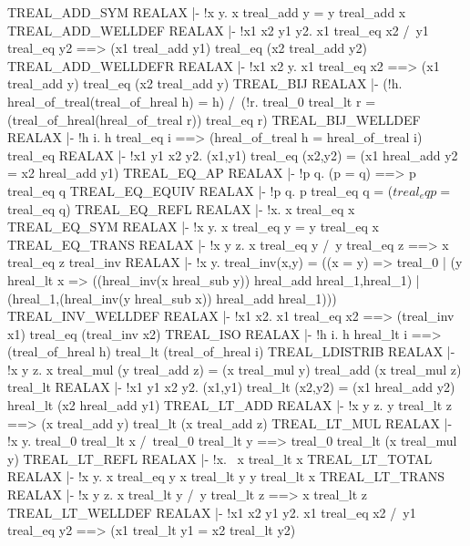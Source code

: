\ENDTHEOREM
\THEOREM TREAL\_ADD\_SYM REALAX
|- !x y. x treal_add y = y treal_add x
\ENDTHEOREM
\THEOREM TREAL\_ADD\_WELLDEF REALAX
|- !x1 x2 y1 y2.
    x1 treal_eq x2 /\ y1 treal_eq y2 ==>
    (x1 treal_add y1) treal_eq (x2 treal_add y2)
\ENDTHEOREM
\THEOREM TREAL\_ADD\_WELLDEFR REALAX
|- !x1 x2 y.
    x1 treal_eq x2 ==> (x1 treal_add y) treal_eq (x2 treal_add y)
\ENDTHEOREM
\THEOREM TREAL\_BIJ REALAX
|- (!h. hreal_of_treal(treal_of_hreal h) = h) /\
   (!r.
     treal_0 treal_lt r = (treal_of_hreal(hreal_of_treal r)) treal_eq r)
\ENDTHEOREM
\THEOREM TREAL\_BIJ\_WELLDEF REALAX
|- !h i. h treal_eq i ==> (hreal_of_treal h = hreal_of_treal i)
\ENDTHEOREM
\THEOREM treal\_eq REALAX
|- !x1 y1 x2 y2.
    (x1,y1) treal_eq (x2,y2) = (x1 hreal_add y2 = x2 hreal_add y1)
\ENDTHEOREM
\THEOREM TREAL\_EQ\_AP REALAX
|- !p q. (p = q) ==> p treal_eq q
\ENDTHEOREM
\THEOREM TREAL\_EQ\_EQUIV REALAX
|- !p q. p treal_eq q = ($treal_eq p = $treal_eq q)
\ENDTHEOREM
\THEOREM TREAL\_EQ\_REFL REALAX
|- !x. x treal_eq x
\ENDTHEOREM
\THEOREM TREAL\_EQ\_SYM REALAX
|- !x y. x treal_eq y = y treal_eq x
\ENDTHEOREM
\THEOREM TREAL\_EQ\_TRANS REALAX
|- !x y z. x treal_eq y /\ y treal_eq z ==> x treal_eq z
\ENDTHEOREM
\THEOREM treal\_inv REALAX
|- !x y.
    treal_inv(x,y) =
    ((x = y) => 
     treal_0 | 
     (y hreal_lt x => 
      ((hreal_inv(x hreal_sub y)) hreal_add hreal_1,hreal_1) | 
      (hreal_1,(hreal_inv(y hreal_sub x)) hreal_add hreal_1)))
\ENDTHEOREM
\THEOREM TREAL\_INV\_WELLDEF REALAX
|- !x1 x2. x1 treal_eq x2 ==> (treal_inv x1) treal_eq (treal_inv x2)
\ENDTHEOREM
\THEOREM TREAL\_ISO REALAX
|- !h i. h hreal_lt i ==> (treal_of_hreal h) treal_lt (treal_of_hreal i)
\ENDTHEOREM
\THEOREM TREAL\_LDISTRIB REALAX
|- !x y z.
    x treal_mul (y treal_add z) =
    (x treal_mul y) treal_add (x treal_mul z)
\ENDTHEOREM
\THEOREM treal\_lt REALAX
|- !x1 y1 x2 y2.
    (x1,y1) treal_lt (x2,y2) =
    (x1 hreal_add y2) hreal_lt (x2 hreal_add y1)
\ENDTHEOREM
\THEOREM TREAL\_LT\_ADD REALAX
|- !x y z. y treal_lt z ==> (x treal_add y) treal_lt (x treal_add z)
\ENDTHEOREM
\THEOREM TREAL\_LT\_MUL REALAX
|- !x y.
    treal_0 treal_lt x /\ treal_0 treal_lt y ==>
    treal_0 treal_lt (x treal_mul y)
\ENDTHEOREM
\THEOREM TREAL\_LT\_REFL REALAX
|- !x. ~x treal_lt x
\ENDTHEOREM
\THEOREM TREAL\_LT\_TOTAL REALAX
|- !x y. x treal_eq y \/ x treal_lt y \/ y treal_lt x
\ENDTHEOREM
\THEOREM TREAL\_LT\_TRANS REALAX
|- !x y z. x treal_lt y /\ y treal_lt z ==> x treal_lt z
\ENDTHEOREM
\THEOREM TREAL\_LT\_WELLDEF REALAX
|- !x1 x2 y1 y2.
    x1 treal_eq x2 /\ y1 treal_eq y2 ==>
    (x1 treal_lt y1 = x2 treal_lt y2)
\ENDTHEOREM
